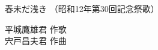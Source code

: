 \documentclass[10pt,b5j]{tarticle} %
\begin{document}
\begin{minipage}[c]{0.7\hsize} %
    \begin{center}
        {\LARGE
            春未だ浅き %
        }
        {\small 
            （昭和12年第30回記念祭歌） %
        }
    \end{center}
\end{minipage}
\begin{minipage}[c]{0.3\hsize} %
    \begin{flushright} %
        平城鷹雄君 作歌\\宍戸昌夫君 作曲 %
    \end{flushright}
\end{minipage}
\end{document}
